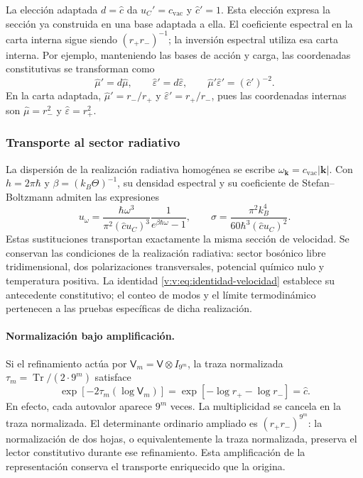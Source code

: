 La elección adaptada $d=\widehat c$ da $u_C'=c_{\mathrm{vac}}$ y
$\widehat c'=1$. Esta elección expresa la sección ya construida en una
base adaptada a ella. El coeficiente espectral en la carta interna sigue
siendo $(r_+r_-)^{-1}$; la inversión espectral utiliza esa carta interna.
Por ejemplo, manteniendo las bases de acción y carga, las coordenadas
constitutivas se transforman como
\[
 \widehat\mu'=d\widehat\mu,
 \qquad \widehat\varepsilon'=d\widehat\varepsilon,
 \qquad
 \widehat\mu'\widehat\varepsilon'=(\widehat c')^{-2}.
\]
En la carta adaptada, $\widehat\mu'=r_-/r_+$ y
$\widehat\varepsilon'=r_+/r_-$, pues las coordenadas internas son
$\widehat\mu=r_-^2$ y $\widehat\varepsilon=r_+^2$.

\subsubsection{Transporte al sector radiativo}

La dispersión de la realización radiativa homogénea se escribe
$\omega_{\symbf{k}}=c_{\mathrm{vac}}|\symbf{k}|$.
Con $h=2\pi\hbar$ y $\beta=(k_B\Theta)^{-1}$, su densidad espectral
y su coeficiente de Stefan--Boltzmann admiten las expresiones
\begin{equation}
 u_\omega=
 \frac{\hbar\omega^3}{\pi^2(\widehat c u_C)^3}
 \frac{1}{e^{\beta\hbar\omega}-1},
 \qquad
 \sigma=\frac{\pi^2k_B^4}{60\hbar^3(\widehat c u_C)^2}.
 \label{v:v:eq:radiacion-velocidad-constitutiva}
\end{equation}
Estas sustituciones transportan exactamente la misma sección de
velocidad. Se conservan las condiciones de la realización radiativa:
sector bosónico libre tridimensional, dos polarizaciones transversales,
potencial químico nulo y temperatura positiva. La identidad
\eqref{v:v:eq:identidad-velocidad} establece su antecedente constitutivo;
el conteo de modos y el límite termodinámico pertenecen a las pruebas
específicas de dicha realización.

\paragraph{Normalización bajo amplificación.}
Si el refinamiento actúa por $\mathsf V_m=\mathsf V\otimes I_{9^m}$,
la traza normalizada $\tau_m=\operatorname{Tr}/(2\cdot9^m)$ satisface
\[
 \exp[-2\tau_m(\log\mathsf V_m)]
 =\exp[-\log r_+-\log r_-]=\widehat c.
\]
En efecto, cada autovalor aparece $9^m$ veces. La multiplicidad se
cancela en la traza normalizada. El determinante ordinario ampliado es
$(r_+r_-)^{9^m}$: la normalización de dos hojas, o equivalentemente la
traza normalizada, preserva el lector constitutivo durante ese
refinamiento. Esta amplificación de la representación conserva el
transporte enriquecido que la origina.

